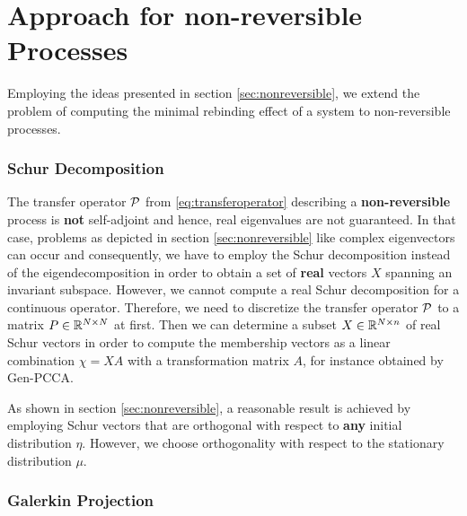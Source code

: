 \section{Approach for non-reversible Processes}
\label{sec:rebinding_nonreversible}

Employing the ideas presented in section \ref{sec:nonreversible}, we extend the problem of computing the minimal rebinding effect of a system to non-reversible processes. %

\subsubsection*{Schur Decomposition}
The transfer operator $\mathcal{P}$ from \eqref{eq:transferoperator} describing a \textbf{non-reversible} process is \textbf{not} self-adjoint and hence, real eigenvalues are not guaranteed. %
In that case, problems as depicted in section \ref{sec:nonreversible} like complex eigenvectors can occur and consequently, we have to employ the Schur decomposition instead of the eigendecomposition in order to obtain a set of \textbf{real} vectors $X$ spanning an invariant subspace. %
However, we cannot compute a real Schur decomposition for a continuous operator.
Therefore, we need to discretize the transfer operator $\mathcal{P}$ to a matrix $P \in \mathbb{R}^{N \times N}$ at first. 
Then we can determine a subset $X \in \mathbb{R}^{N \times n}$ of real Schur vectors in order to compute the membership vectors as a linear combination $\chi = XA$ with a transformation matrix $A$, for instance obtained by Gen-PCCA. %

As shown in section \ref{sec:nonreversible}, a reasonable result is achieved by employing Schur vectors that are orthogonal with respect to \textbf{any} initial distribution $\eta$.
However, we choose orthogonality with respect to the stationary distribution $\mu$. 

\subsubsection*{Galerkin Projection}

